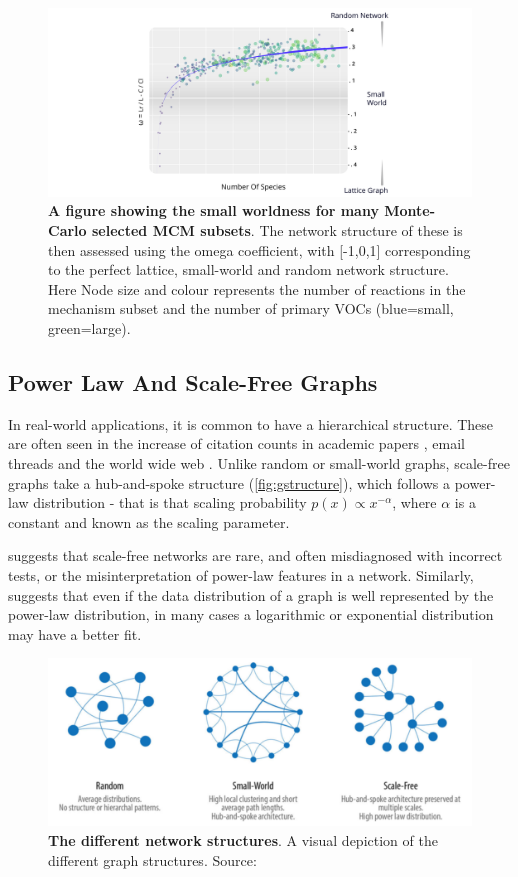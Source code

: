\begin{figure}[H]
     \centering
         \includegraphics[width=\textwidth]{figures_c3/logpart.pdf}
        \caption{\textbf{A figure showing the small worldness for many Monte-Carlo selected MCM subsets}. The network structure of these is then assessed using the omega coefficient, with [-1,0,1] corresponding to the perfect lattice, small-world and random network structure. Here Node size and colour represents the number of reactions in the mechanism subset and the number of primary VOCs (blue=small, green=large).}
        \label{fig:smw}
\end{figure}



\subsection{Power Law And Scale-Free Graphs}
In real-world applications, it is common to have a hierarchical structure. These are often seen in the increase of citation counts in academic papers \citep{scalefreepapers}, email threads \citep{scalefreeemail} and the world wide web \citep{neoj4}. Unlike random or small-world graphs, scale-free graphs take a hub-and-spoke structure (\autoref{fig:gstructure}), which follows a power-law distribution - that is that scaling probability $p(x) \propto x^{-\alpha}$, where $\alpha$ is a constant and known as the scaling parameter.

\cite{scalefreebad} suggests that scale-free networks are rare, and often misdiagnosed with incorrect tests, or the misinterpretation of power-law features in a network. Similarly, \cite{plexp} suggests that even if the data distribution of a graph is well represented by the power-law distribution, in many cases a logarithmic or exponential distribution may have a better fit.

\begin{figure}[H]
     \centering
         \includegraphics[width=.8\textwidth]{figures_c3/graphstyles.png}
        \caption{\textbf{The different network structures}. A visual depiction of the different graph structures. Source: \cite{neoj4}}
        \label{fig:gstructure}
\end{figure}

